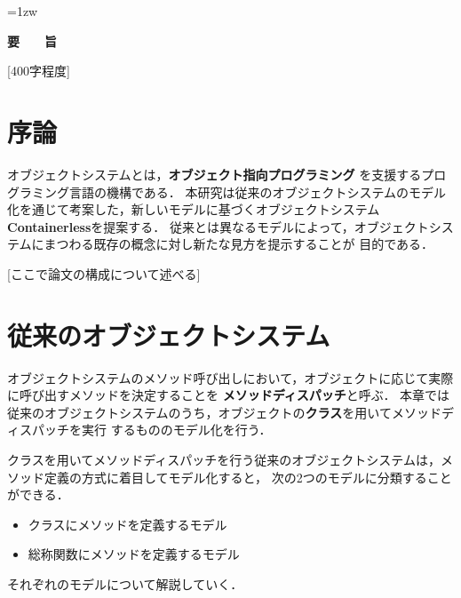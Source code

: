 \documentclass[a4paper,11pt,dvipdfmx]{jreport}
\title{\Underline{Containerless：オブジェクトシステムの新しいとらえ方}}
\author{林 拓人}
\begin{document}
\maketitle
\thispagestyle{empty}
\newpage

\thispagestyle{empty}
\vspace*{20pt plus 1fil}
\parindent=1zw
\noindent
\begin{center}
{\Large \bf 要　　旨}
\vspace{2cm}
\end{center}
[400字程度]

\par
\vspace{0pt plus 1fil}
\newpage

\tableofcontents
\listoffigures

\pagebreak \setcounter{page}{1}


\chapter{序論}

オブジェクトシステムとは，\textbf{オブジェクト指向プログラミング}\cite{Stroustrup:1988:OP:624569.624721}
を支援するプログラミング言語の機構である．
本研究は従来のオブジェクトシステムのモデル化を通じて考案した，新しいモデルに基づくオブジェクトシステム
\textbf{Containerless}を提案する．
従来とは異なるモデルによって，オブジェクトシステムにまつわる既存の概念に対し新たな見方を提示することが
目的である．

[ここで論文の構成について述べる]


\chapter{従来のオブジェクトシステム}

オブジェクトシステムのメソッド呼び出しにおいて，オブジェクトに応じて実際に呼び出すメソッドを決定することを
\textbf{メソッドディスパッチ}と呼ぶ．
本章では従来のオブジェクトシステムのうち，オブジェクトの\textbf{クラス}を用いてメソッドディスパッチを実行
するもののモデル化を行う．

クラスを用いてメソッドディスパッチを行う従来のオブジェクトシステムは，メソッド定義の方式に着目してモデル化すると，
次の2つのモデルに分類することができる．
\begin{itemize}
	\item クラスにメソッドを定義するモデル
	\item 総称関数にメソッドを定義するモデル
\end{itemize}
それぞれのモデルについて解説していく．
\end{document}

